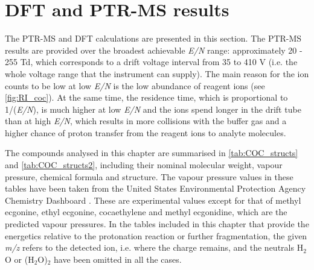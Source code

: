 \section{DFT and PTR-MS results}
The PTR-MS and DFT calculations are  presented in this section. The PTR-MS results are provided over the broadest achievable \textit{E/N} range: approximately 20 - 255 Td, which corresponds to a drift voltage interval from 35 to 410 V (i.e. the whole  voltage range that the instrument can supply). 
The main reason for the ion counts to be low at low \textit{E/N} is the low abundance of reagent ions (see \autoref{fig:RI_coc}). 
At the same time, the residence time, which is proportional to 1/(\textit{E/N}), is much higher at low \textit{E/N} and the ions spend longer in the drift tube than at high \textit{E/N}, which results in more collisions with the buffer gas and a higher chance of proton transfer from the reagent ions to analyte molecules. 
%
%



%
%
%
%

The compounds analysed in this chapter are summarised in \autoref{tab:COC_structs} and \autoref{tab:COC_structs2}, including their nominal molecular weight, vapour pressure, chemical formula and structure.
%
The vapour pressure values in these tables have been taken from the United States Environmental Protection Agency Chemistry Dashboard \cite{USAEPA}. These are experimental values except for that of methyl ecgonine, ethyl ecgonine, cocaethylene and methyl ecgonidine, which are the predicted vapour pressures.
%
 In the tables included in this chapter that provide the energetics relative to the protonation reaction or further fragmentation, the given \textit{m/z} refers to the detected ion, i.e. where the charge remains, and the neutrals H$_2$O or (H$_2$O)$_2$ have been omitted in all the cases.





